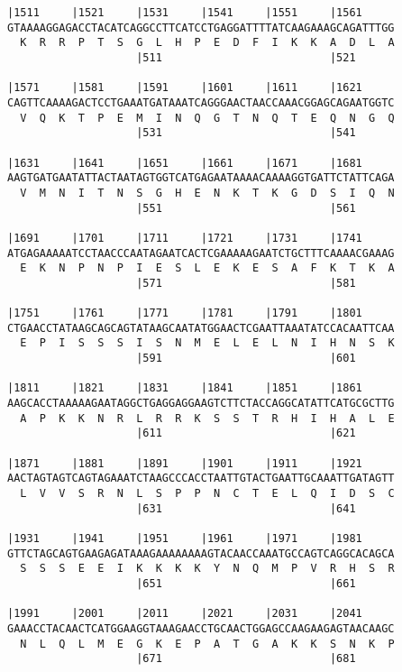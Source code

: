 \documentclass{article}
\begin{document}
\newpage
\begin{Verbatim}[fontfamily=courier]
|1511     |1521     |1531     |1541     |1551     |1561     
GTAAAAGGAGACCTACATCAGGCCTTCATCCTGAGGATTTTATCAAGAAAGCAGATTTGG
  K  R  R  P  T  S  G  L  H  P  E  D  F  I  K  K  A  D  L  A
                    |511                          |521      

|1571     |1581     |1591     |1601     |1611     |1621     
CAGTTCAAAAGACTCCTGAAATGATAAATCAGGGAACTAACCAAACGGAGCAGAATGGTC
  V  Q  K  T  P  E  M  I  N  Q  G  T  N  Q  T  E  Q  N  G  Q
                    |531                          |541      

|1631     |1641     |1651     |1661     |1671     |1681     
AAGTGATGAATATTACTAATAGTGGTCATGAGAATAAAACAAAAGGTGATTCTATTCAGA
  V  M  N  I  T  N  S  G  H  E  N  K  T  K  G  D  S  I  Q  N
                    |551                          |561      

|1691     |1701     |1711     |1721     |1731     |1741     
ATGAGAAAAATCCTAACCCAATAGAATCACTCGAAAAAGAATCTGCTTTCAAAACGAAAG
  E  K  N  P  N  P  I  E  S  L  E  K  E  S  A  F  K  T  K  A
                    |571                          |581      

|1751     |1761     |1771     |1781     |1791     |1801     
CTGAACCTATAAGCAGCAGTATAAGCAATATGGAACTCGAATTAAATATCCACAATTCAA
  E  P  I  S  S  S  I  S  N  M  E  L  E  L  N  I  H  N  S  K
                    |591                          |601      

|1811     |1821     |1831     |1841     |1851     |1861     
AAGCACCTAAAAAGAATAGGCTGAGGAGGAAGTCTTCTACCAGGCATATTCATGCGCTTG
  A  P  K  K  N  R  L  R  R  K  S  S  T  R  H  I  H  A  L  E
                    |611                          |621      

|1871     |1881     |1891     |1901     |1911     |1921     
AACTAGTAGTCAGTAGAAATCTAAGCCCACCTAATTGTACTGAATTGCAAATTGATAGTT
  L  V  V  S  R  N  L  S  P  P  N  C  T  E  L  Q  I  D  S  C
                    |631                          |641      

|1931     |1941     |1951     |1961     |1971     |1981     
GTTCTAGCAGTGAAGAGATAAAGAAAAAAAAGTACAACCAAATGCCAGTCAGGCACAGCA
  S  S  S  E  E  I  K  K  K  K  Y  N  Q  M  P  V  R  H  S  R
                    |651                          |661      

|1991     |2001     |2011     |2021     |2031     |2041     
GAAACCTACAACTCATGGAAGGTAAAGAACCTGCAACTGGAGCCAAGAAGAGTAACAAGC
  N  L  Q  L  M  E  G  K  E  P  A  T  G  A  K  K  S  N  K  P
                    |671                          |681      

\end{Verbatim}
\end{document}
